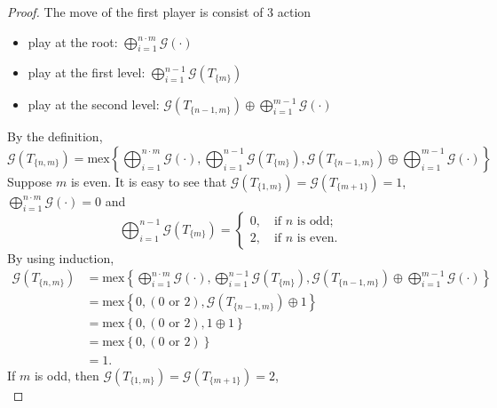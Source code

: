 \documentclass[10pt,a4paper]{amsart}
\begin{document}
\begin{proof}
	The move of the first player is consist of 3 action
	\begin{itemize}
		\item play at the root: $\bigoplus_{i=1}^{n\cdot m}\mathcal{G}\left(\cdot\right)$
		\item play at the first level: $\bigoplus_{i=1}^{n-1}\mathcal{G}\left(T_{\{m\}}\right)$
		\item play at the second level: $\mathcal{G}\left(T_{\{n-1,m\}}\right) \oplus \bigoplus_{i=1}^{m-1}\mathcal{G}\left(\cdot\right)$
	\end{itemize}
	By the definition,
	\begin{equation*}
		\mathcal{G}\left(T_{\{n,m\}}\right) = \mathrm{mex}\left\{\bigoplus_{i=1}^{n\cdot m}\mathcal{G}\left(\cdot\right), \bigoplus_{i=1}^{n-1}\mathcal{G}\left(T_{\{m\}}\right), \mathcal{G}\left(T_{\{n-1,m\}}\right) \oplus \bigoplus_{i=1}^{m-1}\mathcal{G}\left(\cdot\right)\right\}
	\end{equation*}
	Suppose $m$ is even. It is easy to see that $\mathcal{G}\left(T_{\{1,m\}}\right) = \mathcal{G}\left(T_{\{m+1\}}\right) =  1$, $\bigoplus_{i=1}^{n\cdot m}\mathcal{G}\left(\cdot\right) = 0$ and
	\begin{equation*}
		\bigoplus_{i=1}^{n-1}\mathcal{G}\left(T_{\{m\}}\right) = \begin{cases}
			0,	\quad \text{if $n$ is odd};\\
			2,	\quad \text{if $n$ is even}.
		\end{cases}
	\end{equation*} By using induction,
	\begin{align*}
		\mathcal{G}\left(T_{\{n,m\}}\right) &= \mathrm{mex}\left\{\bigoplus_{i=1}^{n\cdot m}\mathcal{G}\left(\cdot\right), \bigoplus_{i=1}^{n-1}\mathcal{G}\left(T_{\{m\}}\right), \mathcal{G}\left(T_{\{n-1,m\}}\right) \oplus \bigoplus_{i=1}^{m-1}\mathcal{G}\left(\cdot\right)\right\}\\
		&= \mathrm{mex}\left\{0, (0 \text{ or } 2), \mathcal{G}\left(T_{\{n-1,m\}}\right) \oplus  1\right\}\\
		&= \mathrm{mex}\left\{0, (0 \text{ or } 2), 1 \oplus  1\right\}\\
		&= \mathrm{mex}\left\{0, (0 \text{ or } 2)\right\}\\
		&= 1.
	\end{align*}
	If $m$ is odd, then $\mathcal{G}\left(T_{\{1,m\}}\right) = \mathcal{G}\left(T_{\{m+1\}}\right) =  2$,
	\begin{equation*}

\end{equation*}
\end{proof}
\end{document}
